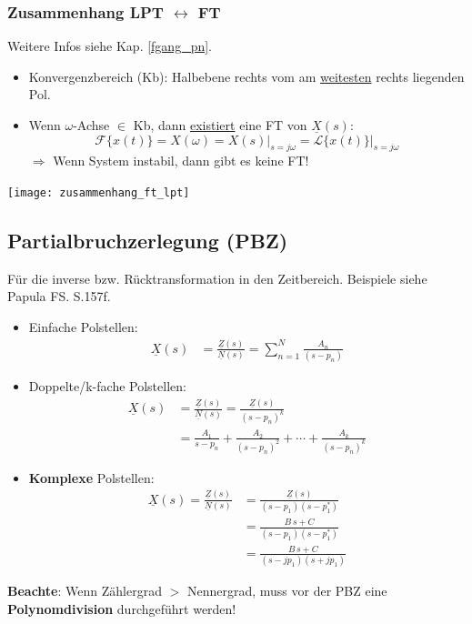 \subsubsection{Zusammenhang LPT $\leftrightarrow$ FT}
Weitere Infos siehe Kap. \ref{fgang_pn}.
\begin{itemize}
	\item Konvergenzbereich (Kb): Halbebene rechts vom am \underline{weitesten} rechts liegenden Pol.
	\item Wenn $\omega$-Achse $\in$ Kb, dann \underline{existiert} eine FT von $\underline{X}(s)$:
	\[
	\mathcal{F}\{x(t)\} = X(\omega) = X(s) \big|_{s=j\omega} = \mathcal{L}\{x(t)\} \big|_{s=j\omega}
	\]
	$\Rightarrow$ Wenn System instabil, dann gibt es keine FT!
\end{itemize}
\texttt{[image: zusammenhang\_ft\_lpt]}
\subsection{Partialbruchzerlegung (PBZ)}
Für die inverse bzw. Rücktransformation in den Zeitbereich. Beispiele siehe Papula FS. S.157f.
\begin{itemize}
	\item Einfache Polstellen:
		\begin{align*}
		\underline{X}(s) &= \frac{\underline{Z}(s)}{\underline{N}(s)} = \sum_{n=1}^{N} \frac{A_n}{(s - p_n)}
	\end{align*}
	\item Doppelte/k-fache Polstellen:
	\begin{align*}
			\underline{X}(s) &= \frac{\underline{Z}(s)}{\underline{N}(s)} = \frac{\underline{Z}(s)}{(s - p_n)^k} \\
			&= \frac{A_1}{s - p_{n}} + \frac{A_2}{(s - p_{n})^2} + \cdots + \frac{A_k}{(s - p_{n})^k}
	\end{align*}
	\item \textbf{Komplexe} Polstellen:
		\begin{align*}
		\underline{X}(s) = \frac{\underline{Z}(s)}{\underline{N}(s)} 
		&= \frac{\underline{Z}(s)}{(s -p_{1})(s - p_{1}^*)}\\
		&= \frac{B \, s+C}{(s -p_{1})(s - p_{1}^*)}\\ &= \frac{B \, s+C}{(s -jp_{1})(s +jp_{1})}
	\end{align*}
\end{itemize}
\small \textbf{Beachte}: Wenn Zählergrad $>$ Nennergrad, muss vor der PBZ eine \textbf{Polynomdivision} durchgeführt werden!
\normalsize
